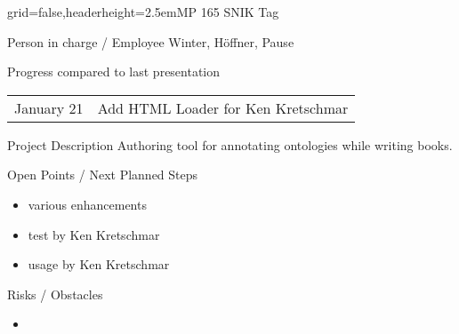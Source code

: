 \documentclass[english]{kiesgrube}
\begin{document}

\newpage

\begin{poster}{grid=false,headerheight=2.5em}{}{MP 165 SNIK Tag}{}{}
\begin{posterbox}[name=person,column=0,row=0]{Person in charge / Employee}
Winter, Höffner, Pause
\end{posterbox}
\begin{posterbox}[name=progress,below=person]{Progress compared to last presentation}
\begin{tabulary}{\textwidth}{lL}
January 21	&Add HTML Loader for Ken Kretschmar\\
\end{tabulary}
\end{posterbox}
\begin{posterbox}[name=description,column=1,row=0]{Project Description}
\small
Authoring tool for annotating ontologies while writing books.
\end{posterbox}
\begin{posterbox}[name=open,column=1,below=description]{Open Points / Next Planned Steps}
\begin{itemize}
\item various enhancements
\item test by Ken Kretschmar
\item usage by Ken Kretschmar
\end{itemize}
\end{posterbox}
\begin{posterbox}[name=risks,column=1,below=open]{Risks / Obstacles}
\begin{itemize}
\item  
\end{itemize}
\end{posterbox}

\end{poster}
\end{document}
